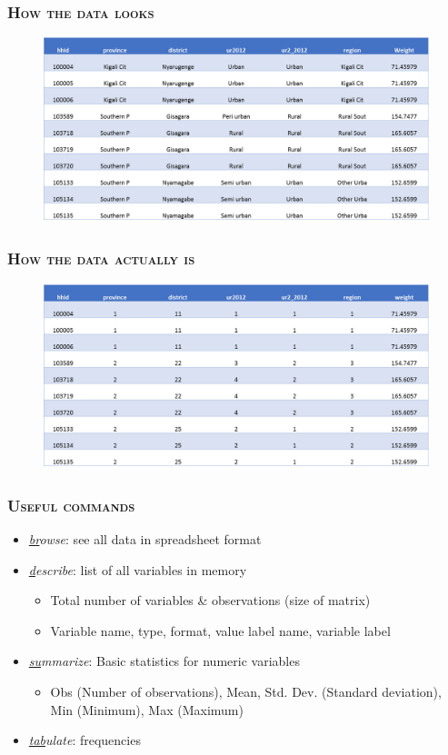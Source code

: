 \documentclass[10pt]{beamer}
\begin{document}
	\begin{frame}
		\frametitle{\textsc{How the data looks}}	
		\begin{figure}[H] 
			\centering
			\includegraphics[width=0.9\linewidth]{dataset1}
		\end{figure}
	\end{frame}
	\begin{frame}
		\frametitle{\textsc{How the data actually is}}	
		\begin{figure}[H] 
			\centering
			\includegraphics[width=0.9\linewidth]{dataset2}
	\end{figure}	
	\end{frame}


	\begin{frame}
		\frametitle{\textsc{Useful commands}}

		\begin{itemize}
			\item 	\textit{\underline{br}owse}: see all data in spreadsheet format
		\onslide<1->	\item \textit{\underline{d}escribe}: list of all variables in memory
			\begin{itemize}
				\item Total number of variables \& observations (size of matrix)
				\item Variable name, type, format, value label name, variable label
			\end{itemize}
			\item \textit{\underline{su}mmarize}: Basic statistics for numeric variables
			\begin{itemize}
				\item Obs (Number of observations), Mean, Std. Dev. (Standard deviation), Min (Minimum), Max (Maximum)
			\end{itemize}
			\item \textit{\underline{tab}ulate}: frequencies
			
		\end{itemize}
	\end{frame}
\end{document}
